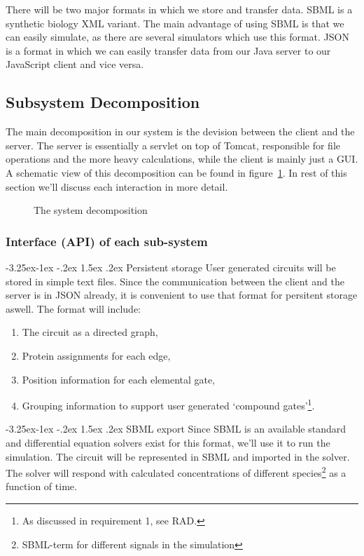 \documentclass[a4paper]{article}
\makeatletter
\renewcommand\paragraph{\@startsection{paragraph}{4}{\z@}%
  {-3.25ex\@plus -1ex \@minus -.2ex}%
  {1.5ex \@plus .2ex}%
  {\normalfont\normalsize\bfseries}}
\makeatother
\begin{document}
There will be two major formats in which we store and transfer data. SBML is a synthetic biology XML variant. The main advantage of using SBML is that we can easily simulate, as there are several simulators which use this format. JSON is a format in which we can easily transfer data from our Java server to our JavaScript client and vice versa. 

\subsection{Subsystem Decomposition}
The main decomposition in our system is the devision between the client and the server. The server is essentially a servlet on top of Tomcat, responsible for file operations and the more heavy calculations, while the client is mainly just a GUI. A schematic view of this decomposition can be found in figure~\ref{fig-decomposition}. In rest of this section we'll discuss each interaction in more detail.

\begin{figure}[h!]
	\caption{The system decomposition}
	\label{fig-decomposition}
	\centering
\end{figure}

\pagebreak

\subsubsection{Interface (API) of each sub-system}

\paragraph{Persistent storage}
User generated circuits will be stored in simple text files. Since the communication between the client and the server is in JSON already, it is convenient to use that format for persitent storage aswell. The format will include:
\begin{enumerate}[-]
	\item The circuit as a directed graph,
	\item Protein assignments for each edge,
	\item Position information for each elemental gate,
	\item Grouping information to support user generated `compound gates'\footnote{As discussed in requirement 1, see RAD.}.
\end{enumerate}

\paragraph{SBML export}
Since SBML is an available standard and differential equation solvers exist for this format, we'll use it to run the simulation. The circuit will be represented in SBML and imported in the solver. The solver will respond with calculated concentrations of different species\footnote{SBML-term for different signals in the simulation} as a function of time.
\end{document}

